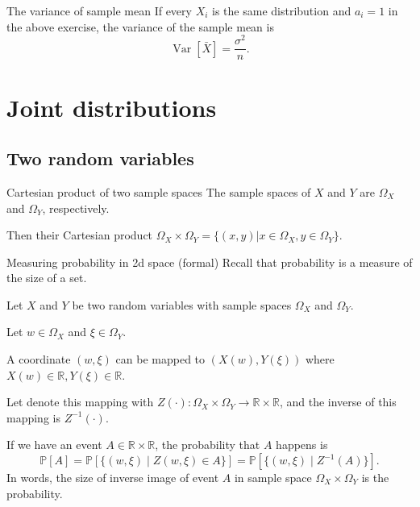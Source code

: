 \documentclass[11pt,a4paper,fleqn]{article}
\numberwithin{equation}{section}
\newcommand{\prob}{\mathbb{P}}
\newcommand{\samplespace}{\Omega}
\DeclareMathOperator\Var{\mathrm{Var}}
\newcommand{\mean}[1]{\bar{#1}}
\begin{document}
\begin{fact}{The variance of sample mean}{}
    If every $X_i$ is the same distribution and $a_i=1$ in the above exercise, the variance of the sample mean is
    \begin{equation*}
        \Var[\mean{X}]=\frac{\sigma^2}{n}.
    \end{equation*}
\end{fact}

\section{Joint distributions}

\subsection{Two random variables}

\begin{fact}{Cartesian product of two sample spaces}{}
    The sample spaces of $X$ and $Y$ are $\samplespace_X$ and $\samplespace_Y$, respectively.
    
    Then their Cartesian product $\samplespace_X\times\samplespace_Y = \{(x,y)|x\in\samplespace_X, y\in\samplespace_Y\}$.
\end{fact}

\begin{fact}{Measuring probability in 2d space (formal)}{}
    Recall that probability is a measure of the size of a set.
    
    Let $X$ and $Y$ be two random variables with sample spaces $\samplespace_X$ and $\samplespace_Y$.
    
    Let $w\in\samplespace_X$ and $\xi\in\samplespace_Y$.
    
    A coordinate $(w,\xi)$ can be mapped to $(X(w),Y(\xi))$ where $X(w)\in\mathbb{R},Y(\xi)\in\mathbb{R}$.
    
    Let denote this mapping with $Z(\cdot): \samplespace_X\times\samplespace_Y\rightarrow\mathbb{R}\times\mathbb{R}$, and the inverse of this mapping is $Z^{-1}(\cdot)$.
    
    If we have an event $A\in\mathbb{R}\times\mathbb{R}$, the probability that $A$ happens is
    \begin{equation*}
        \prob[A]=\prob[\{(w,\xi) \mid Z(w,\xi)\in A\}] = \prob[\{(w,\xi) \mid Z^{-1}(A)\} ].
    \end{equation*}
    In words, the size of inverse image of event $A$ in sample space $\samplespace_X\times\samplespace_Y$ is the probability.
\end{fact}
\end{document}
